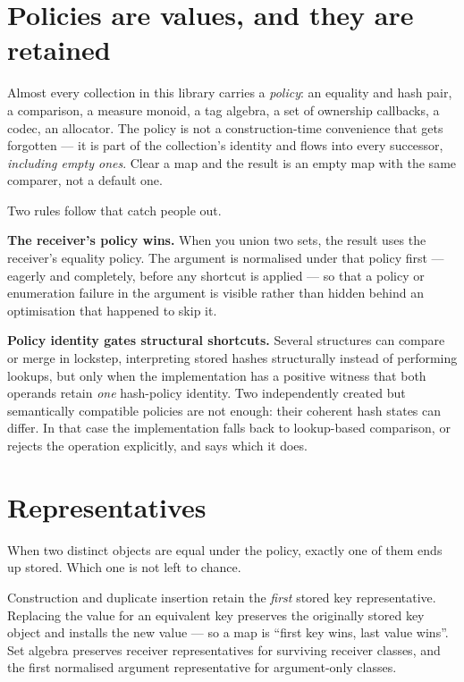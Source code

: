 \documentclass[11pt,twoside,openright]{book}
\newcommand{\term}[1]{\textit{#1}}
\begin{document}
\section{Policies are values, and they are retained}

Almost every collection in this library carries a \term{policy}: an equality and
hash pair, a comparison, a measure monoid, a tag algebra, a set of ownership
callbacks, a codec, an allocator. The policy is not a construction-time
convenience that gets forgotten --- it is part of the collection's identity and
flows into every successor, \emph{including empty ones}. Clear a map and the
result is an empty map with the same comparer, not a default one.

Two rules follow that catch people out.

\textbf{The receiver's policy wins.} When you union two sets, the result uses the
receiver's equality policy. The argument is normalised under that policy first
--- eagerly and completely, before any shortcut is applied --- so that a policy
or enumeration failure in the argument is visible rather than hidden behind an
optimisation that happened to skip it.

\textbf{Policy identity gates structural shortcuts.} Several structures can
compare or merge in lockstep, interpreting stored hashes structurally instead of
performing lookups, but only when the implementation has a positive witness that
both operands retain \emph{one} hash-policy identity. Two independently created
but semantically compatible policies are not enough: their coherent hash states
can differ. In that case the implementation falls back to lookup-based
comparison, or rejects the operation explicitly, and says which it does.

\section{Representatives}

When two distinct objects are equal under the policy, exactly one of them ends
up stored. Which one is not left to chance.

\begin{contractbox}
Construction and duplicate insertion retain the \emph{first} stored key
representative. Replacing the value for an equivalent key preserves the
originally stored key object and installs the new value --- so a map is
``first key wins, last value wins''. Set algebra preserves receiver
representatives for surviving receiver classes, and the first normalised
argument representative for argument-only classes.
\end{contractbox}
\end{document}
